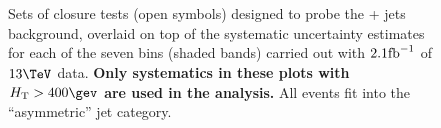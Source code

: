 \clearpage
\begin{figure}[h!]
  \begin{center}
     ~~
     \\
     ~~
     \\
    \caption{Sets of closure tests (open symbols) designed to probe
      the \znunu + jets background, overlaid on top of
      the systematic uncertainty estimates for each of the seven
      \scalht bins (shaded bands) carried out with $2.1\ifb$ of
      $13\tev$ data. {\bf Only systematics in these plots with
      $\scalht>400\gev$ are used in the analysis.} All events fit 
      into the ``asymmetric'' jet
      category.}
    \label{fig:ZinvclosureDataAsymgt400}
  \end{center} 
\end{figure}

